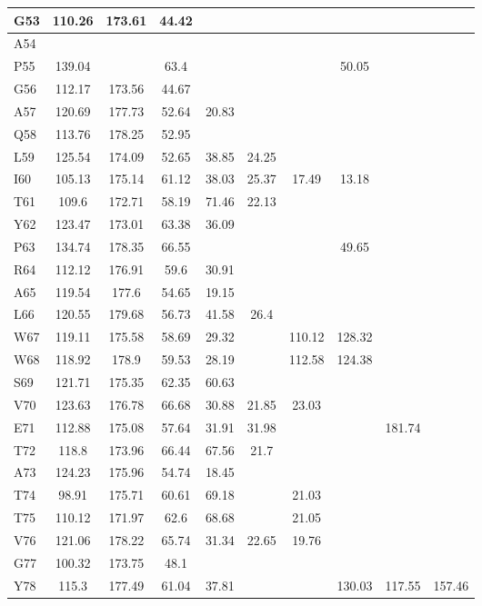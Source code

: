 \documentclass[%
 aip,
 amsmath,amssymb,
 preprint,%
]{revtex4-1}
\begin{document}
\begin{center}
\begin{longtable}{l|c|c|c|c|c|c|c|c|c}
G53 & 110.26 & 173.61 & 44.42 & & & & & & \\ \hline
A54 & & & & & & & & & \\ \hline
P55 & 139.04 & & 63.4 & & & & 50.05 & & \\ \hline
G56 & 112.17 & 173.56 & 44.67 & & & & & & \\ \hline
A57 & 120.69 & 177.73 & 52.64 & 20.83 & & & & & \\ \hline
Q58 & 113.76 & 178.25 & 52.95 & & & & & & \\ \hline
L59 & 125.54 & 174.09 & 52.65 & 38.85 & 24.25 & & & & \\ \hline
I60 & 105.13 & 175.14 & 61.12 & 38.03 & 25.37 & 17.49 & 13.18 & & \\ \hline
T61 & 109.6 & 172.71 & 58.19 & 71.46 & 22.13 & & & & \\ \hline
Y62 & 123.47 & 173.01 & 63.38 & 36.09 & & & & & \\ \hline
P63 & 134.74 & 178.35 & 66.55 & & & & 49.65 & & \\ \hline
R64 & 112.12 & 176.91 & 59.6 & 30.91 & & & & & \\ \hline
A65 & 119.54 & 177.6 & 54.65 & 19.15 & & & & & \\ \hline
L66 & 120.55 & 179.68 & 56.73 & 41.58 & 26.4 & & & & \\ \hline
W67 & 119.11 & 175.58 & 58.69 & 29.32 & & 110.12 & 128.32 & & \\ \hline
W68 & 118.92 & 178.9 & 59.53 & 28.19 & & 112.58 & 124.38 & & \\ \hline
S69 & 121.71 & 175.35 & 62.35 & 60.63 & & & & & \\ \hline
V70 & 123.63 & 176.78 & 66.68 & 30.88 & 21.85 & 23.03 & & & \\ \hline
E71 & 112.88 & 175.08 & 57.64 & 31.91 & 31.98 & & & 181.74 & \\ \hline
T72 & 118.8 & 173.96 & 66.44 & 67.56 & 21.7 & & & & \\ \hline
A73 & 124.23 & 175.96 & 54.74 & 18.45 & & & & & \\ \hline
T74 & 98.91 & 175.71 & 60.61 & 69.18 & & 21.03 & & & \\ \hline
T75 & 110.12 & 171.97 & 62.6 & 68.68 & & 21.05 & & & \\ \hline
V76 & 121.06 & 178.22 & 65.74 & 31.34 & 22.65 & 19.76 & & & \\ \hline
G77 & 100.32 & 173.75 & 48.1 & & & & & & \\ \hline
Y78 & 115.3 & 177.49 & 61.04 & 37.81 & & & 130.03 & 117.55 & 157.46 \\ \hline

\end{longtable}
\end{center}
\end{document}
